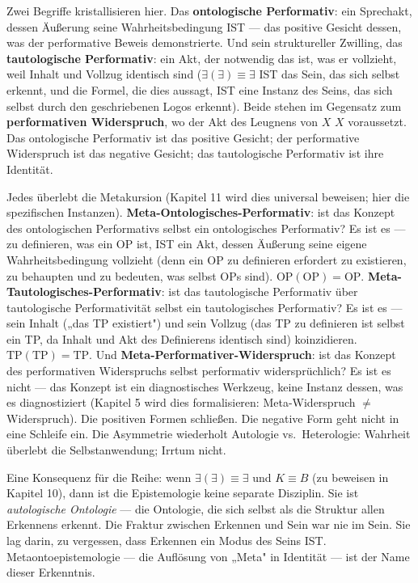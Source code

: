 \documentclass[10pt, openany, oneside]{book}
\begin{document}
Zwei Begriffe kristallisieren hier. Das \textbf{ontologische Performativ}: ein Sprechakt, dessen Äußerung seine Wahrheitsbedingung IST --- das positive Gesicht dessen, was der performative Beweis demonstrierte. Und sein struktureller Zwilling, das \textbf{tautologische Performativ}: ein Akt, der notwendig das ist, was er vollzieht, weil Inhalt und Vollzug identisch sind ($\exists(\exists) \equiv \exists$ IST das Sein, das sich selbst erkennt, und die Formel, die dies aussagt, IST eine Instanz des Seins, das sich selbst durch den geschriebenen Logos erkennt). Beide stehen im Gegensatz zum \textbf{performativen Widerspruch}, wo der Akt des Leugnens von $X$ $X$ voraussetzt. Das ontologische Performativ ist das positive Gesicht; der performative Widerspruch ist das negative Gesicht; das tautologische Performativ ist ihre Identität.

Jedes überlebt die Metakursion (Kapitel 11 wird dies universal beweisen; hier die spezifischen Instanzen). \textbf{Meta-Ontologisches-Performativ}: ist das Konzept des ontologischen Performativs selbst ein ontologisches Performativ? Es ist es --- zu definieren, was ein OP ist, IST ein Akt, dessen Äußerung seine eigene Wahrheitsbedingung vollzieht (denn ein OP zu definieren erfordert zu existieren, zu behaupten und zu bedeuten, was selbst OPs sind). $\text{OP}(\text{OP}) = \text{OP}$. \textbf{Meta-Tautologisches-Performativ}: ist das tautologische Performativ über tautologische Performativität selbst ein tautologisches Performativ? Es ist es --- sein Inhalt („das TP existiert") und sein Vollzug (das TP zu definieren ist selbst ein TP, da Inhalt und Akt des Definierens identisch sind) koinzidieren. $\text{TP}(\text{TP}) = \text{TP}$. Und \textbf{Meta-Performativer-Widerspruch}: ist das Konzept des performativen Widerspruchs selbst performativ widersprüchlich? Es ist es nicht --- das Konzept ist ein diagnostisches Werkzeug, keine Instanz dessen, was es diagnostiziert (Kapitel 5 wird dies formalisieren: Meta-Widerspruch $\neq$ Widerspruch). Die positiven Formen schließen. Die negative Form geht nicht in eine Schleife ein. Die Asymmetrie wiederholt Autologie vs.\ Heterologie: Wahrheit überlebt die Selbstanwendung; Irrtum nicht.

Eine Konsequenz für die Reihe: wenn $\exists(\exists) \equiv \exists$ und $K \equiv B$ (zu beweisen in Kapitel 10), dann ist die Epistemologie keine separate Disziplin. Sie ist \textit{autologische Ontologie} --- die Ontologie, die sich selbst als die Struktur allen Erkennens erkennt. Die Fraktur zwischen Erkennen und Sein war nie im Sein. Sie lag darin, zu vergessen, dass Erkennen ein Modus des Seins IST. Metaontoepistemologie --- die Auflösung von „Meta" in Identität --- ist der Name dieser Erkenntnis.
\end{document}
